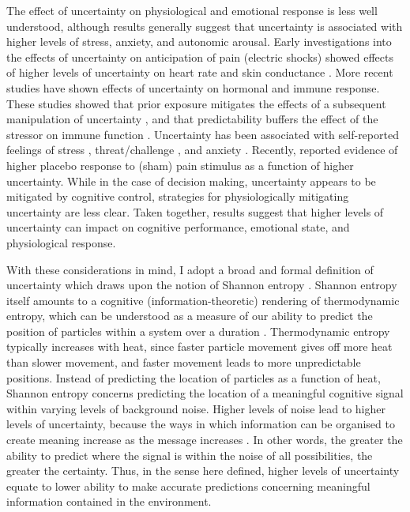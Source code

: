 \begin{CJK}{UTF8}{gbsn}
The effect of uncertainty on physiological and emotional response is less well understood, although results generally suggest that uncertainty is associated with higher levels of stress, anxiety, and autonomic arousal.  Early investigations into the effects of uncertainty on anticipation of pain (electric shocks) showed effects of higher levels of uncertainty on heart rate \citep{Averill1972} and skin conductance \citep{Epstein1970}. More recent studies have shown effects of uncertainty on hormonal \citep[e.g., serum cortisol, see][]{Voigt1990} and immune \citep[e.g., lymphocyte proliferation, see ][]{Zakowski1995} response. These studies showed that prior exposure mitigates the effects of a subsequent manipulation of uncertainty \citep{Voigt1990}, and that predictability buffers the effect of the stressor on immune function \citep{Zakowski1995}.  Uncertainty has been associated with self-reported feelings of stress \citep{Lazarus1985}, threat/challenge \citep{Folkman1985}, and anxiety \citep{Holaway2006}.  Recently, \textcite{Moutoussis2014} reported evidence of higher placebo response to (sham) pain stimulus as a function of higher uncertainty.  While in the case of decision making, uncertainty appears to be mitigated by cognitive control, strategies for physiologically mitigating uncertainty are less clear. Taken together, results suggest that higher levels of uncertainty can impact on cognitive performance, emotional state, and physiological response.

With these considerations in mind, I adopt a broad and formal definition of uncertainty which draws upon the notion of Shannon entropy \citep{Shannon1963}.  Shannon entropy itself amounts to a cognitive (information-theoretic) rendering of thermodynamic entropy, which can be understood as a measure of our ability to predict the position of particles within a system over a duration \citep{Linson2018}. Thermodynamic entropy typically increases with heat, since faster particle movement gives off more heat than slower movement, and faster movement leads to more unpredictable positions.  Instead of predicting the location of particles as a function of heat, Shannon entropy concerns predicting the location of a meaningful cognitive signal within varying levels of background noise.  Higher levels of noise lead to higher levels of uncertainty, because the ways in which information can be organised to create meaning increase as the message increases \citep{Shannon1963}. In other words, the greater the ability to predict where the signal is within the noise of all possibilities, the greater the certainty.  Thus, in the sense here defined, higher levels of uncertainty equate to lower ability to make accurate predictions concerning meaningful information contained in the environment.



\end{CJK}
